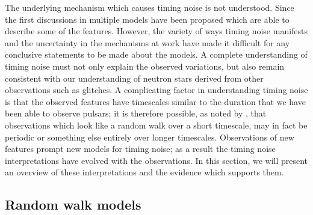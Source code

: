 The underlying mechanism which causes timing noise is not understood. Since the
first discussions in \citet{Boynton1972} multiple models have been proposed
which are able to describe some of the features. However, the variety of ways
timing noise manifests and the uncertainty in the mechanisms at work have made
it difficult for any conclusive statements to be made about the models. A
complete understanding of timing noise must not only explain the observed
variations, but also remain consistent with our understanding of neutron stars
derived from other observations such as glitches. A complicating factor in
understanding timing noise is that the observed features have timescales
similar to the duration that we have been able to observe pulsars; it is
therefore possible, as noted by \citet{Hobbs2010}, that observations which look
like a random walk over a short timescale, may in fact be periodic or something
else entirely over longer timescales.  Observations of new features prompt new
models for timing noise; as a result the timing noise interpretations have
evolved with the observations. In this section, we will present an overview of
these interpretations and the evidence which supports them.

\subsection{Random walk models}
\label{sec: TN interpretations random walk models}

